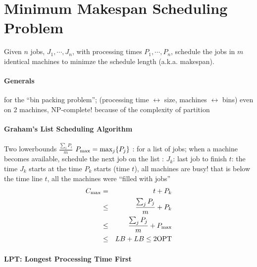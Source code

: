 \documentclass{note}
\def\opt{\mbox{OPT}}
\begin{document}
\section*{Minimum Makespan Scheduling Problem}
\begin{problem}
Given $n$ jobs, $J_1, \cdots, J_n$, with processing times
$P_1, \cdots, P_n$, schedule the jobs in $m$ identical machines
to minimze the schedule length (a.k.a. makespan).
\end{problem}



\paragraph{Generals}
\bit
\w {} for the ``bin packing problem'';  
  (processing time
  $\leftrightarrow$ size, machines $\leftrightarrow$ bins)
\w even on $2$ machines, NP-complete!
  \bit
  \w because of the complexity of partition
  \eit
\eit

\paragraph{Graham's List Scheduling Algorithm}
\bit
\w Two lowerbounds
  \bit
  \w $\frac{\sum_i{P_i}}{m}$
  \w $P_{\mbox{\scriptsize{}max}} = \mbox{max}_j\{P_j\}$
  \eit
\w {}: for a list of jobs; when a machine becomes available,
schedule the next job on the list
\w {}:
  \bit
  \w $J_k$: last job to finish
  \w $t$: the time $J_k$ starts
  \w at the time $P_k$ starts (time $t$), all machines are busy! that is
     below the time line $t$, all the machines were ``filled with jobs''
\begin{eqnarray*}
 C_{\mbox{\scriptsize max}} & = & t + P_k\\
 & \le & \frac{\sum_{j}P_j}{m} + P_k\\
 & \le & \frac{\sum_{j}P_j}{m} + P_{\mbox{\scriptsize max}}\\
 & \le & LB + LB \le 2\opt
\end{eqnarray*}
  \eit
\eit

\paragraph{LPT: Longest Processing Time First}
\end{document}
